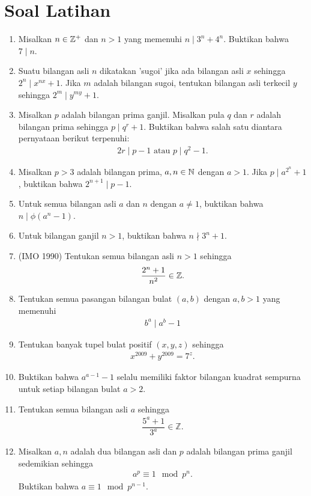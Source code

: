 \documentclass[12pt]{scrartcl}
\begin{document}
\section{Soal Latihan}
\begin{enumerate}
    \item Misalkan $n \in \mathbb Z^+$ dan $n > 1$ yang memenuhi $n \mid 3^n + 4^n$. Buktikan bahwa $7 \mid n$.
    \item Suatu bilangan asli $n$ dikatakan 'sugoi' jika ada bilangan asli $x$ sehingga $2^n \mid x^{nx}+1$. Jika $m$ adalah bilangan sugoi, tentukan bilangan asli terkecil $y$ sehingga $2^m \mid y^{my}+1$.
    \item Misalkan $p$ adalah bilangan prima ganjil. Misalkan pula $q$ dan $r$ adalah bilangan prima sehingga $p \mid q^r+1$. Buktikan bahwa salah satu diantara pernyataan berikut terpenuhi: 
    \begin{align*}
        2r \mid p-1 \text{ atau } p \mid q^2-1.
    \end{align*}
    \item Misalkan $p>3$ adalah bilangan prima, $a,n \in \mathbb N$ dengan $a > 1$. Jika $p \mid a^{2^n}+1$, buktikan bahwa $2^{n+1} \mid p-1$.
    \item Untuk semua bilangan asli $a$ dan $n$ dengan $a \neq 1$, buktikan bahwa $n \mid \phi(a^n-1)$.
    \item Untuk bilangan ganjil $n > 1$, buktikan bahwa $n \nmid 3^n+1$.
    \item (IMO 1990) Tentukan semua bilangan asli $n > 1$ sehingga 
    \begin{align*}
        \dfrac{2^n+1}{n^2} \in \mathbb Z.
    \end{align*}
    \item Tentukan semua pasangan bilangan bulat $(a,b)$ dengan $a,b > 1$ yang memenuhi 
    \begin{align*}
        b^a \mid a^b -1
    \end{align*}
    \item Tentukan banyak tupel bulat positif $(x,y,z)$ sehingga
    \begin{align*}
        x^{2009}+y^{2009} = 7^z.
    \end{align*}
    \item Buktikan bahwa $a^{a-1}-1$ selalu memiliki faktor bilangan kuadrat sempurna untuk setiap bilangan bulat $a > 2$.
    \item Tentukan semua bilangan asli $a$ sehingga
    \begin{align*}
        \dfrac{5^a+1}{3^a} \in \mathbb{Z}.
    \end{align*}
    \item Misalkan $a,n$ adalah dua bilangan asli dan $p$ adalah bilangan prima ganjil sedemikian sehingga
    \begin{align*}
        a^p \equiv 1 \mod p^n.
    \end{align*}
    Buktikan bahwa $a \equiv 1 \mod p^{n-1}.$
\end{enumerate}
\end{document}
